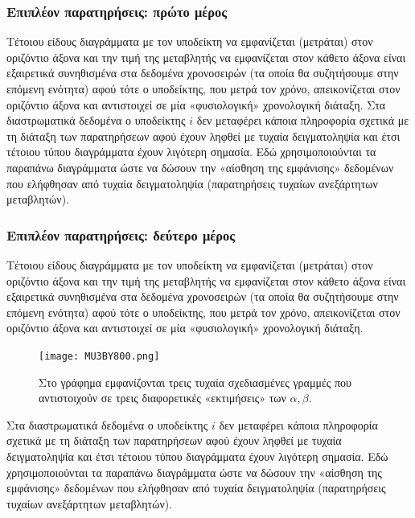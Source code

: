 \documentclass[12pt,a4paper,oneside]{book}
\begin{document}
\subsubsection{Επιπλέον παρατηρήσεις: πρώτο μέρος}
Τέτοιου είδους διαγράμματα με τον υποδείκτη να εμφανίζεται (μετράται) στον οριζόντιο άξονα και την τιμή της μεταβλητής να εμφανίζεται στον κάθετο άξονα είναι εξαιρετικά συνηθισμένα στα δεδομένα χρονοσειρών (τα οποία θα συζητήσουμε στην επόμενη ενότητα) αφού τότε ο υποδείκτης, που μετρά τον χρόνο, απεικονίζεται στον οριζόντιο άξονα και αντιστοιχεί σε μία «φυσιολογική» χρονολογική διάταξη. Στα διαστρωματικά δεδομένα ο υποδείκτης $i$ δεν μεταφέρει κάποια πληροφορία σχετικά με τη διάταξη των παρατηρήσεων αφού έχουν ληφθεί με τυχαία δειγματοληψία και έτσι τέτοιου τύπου διαγράμματα έχουν λιγότερη σημασία. Εδώ χρησιμοποιούνται τα παραπάνω διαγράμματα ώστε να δώσουν την «αίσθηση της εμφάνισης» δεδομένων που ελήφθησαν από τυχαία δειγματοληψία (παρατηρήσεις τυχαίων ανεξάρτητων μεταβλητών).
\subsubsection{Επιπλέον παρατηρήσεις: δεύτερο μέρος}
Τέτοιου είδους διαγράμματα με τον υποδείκτη να εμφανίζεται (μετράται) στον οριζόντιο άξονα και την τιμή της μεταβλητής να εμφανίζεται στον κάθετο άξονα είναι εξαιρετικά συνηθισμένα στα δεδομένα χρονοσειρών (τα οποία θα συζητήσουμε στην επόμενη ενότητα) αφού τότε ο υποδείκτης, που μετρά τον χρόνο, απεικονίζεται στον οριζόντιο άξονα και αντιστοιχεί σε μία «φυσιολογική» χρονολογική διάταξη.

\begin{figure}[!ht]
	\centering
	\texttt{[image: MU3BY800.png]}
	\caption{Στο γράφημα εμφανίζονται τρεις τυχαία σχεδιασμένες γραμμές που αντιστοιχούν σε τρεις διαφορετικές «εκτιμήσεις» των $\alpha,\beta$.}
	\label{sxima2}
\end{figure}

Στα διαστρωματικά δεδομένα ο υποδείκτης $i$ δεν μεταφέρει κάποια πληροφορία σχετικά με τη διάταξη των παρατηρήσεων αφού έχουν ληφθεί με τυχαία δειγματοληψία και έτσι τέτοιου τύπου διαγράμματα έχουν λιγότερη σημασία. Εδώ χρησιμοποιούνται τα παραπάνω διαγράμματα ώστε να δώσουν την «αίσθηση της εμφάνισης» δεδομένων που ελήφθησαν από τυχαία δειγματοληψία (παρατηρήσεις τυχαίων ανεξάρτητων μεταβλητών).
\end{document}
